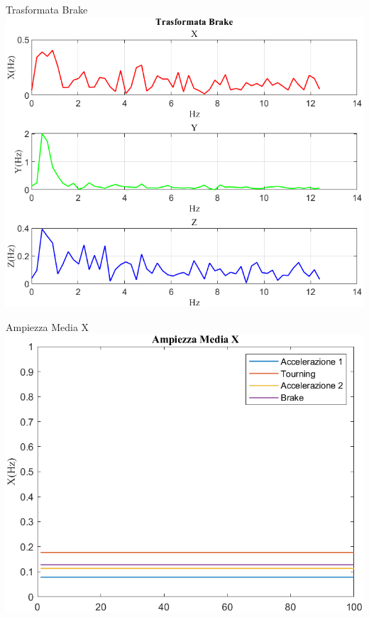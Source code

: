 \documentclass[beamer]{standalone}
\begin{document}
	\begin{frame}{{Trasformata Brake}}
		\centering\includegraphics[height=.8\textheight]{figure/Mag/Trasformata/Trasformata Brake}
	\end{frame}
	
	\begin{frame}{{Ampiezza Media X}}
		\centering\includegraphics[height=.8\textheight]{figure/Mag/Trasformata/Ampiezza MediaX}
	\end{frame}
	
\end{document}
